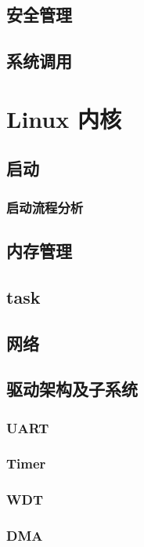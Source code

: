 \subsection{安全管理}

\subsection{系统调用}

\section{Linux 内核}

\subsection{启动}
\subsubsection{启动流程分析}

\subsection{内存管理}

\subsection{task}

\subsection{网络}

\subsection{驱动架构及子系统}
\subsubsection{UART}

\subsubsection{Timer}

\subsubsection{WDT}

\subsubsection{DMA}

